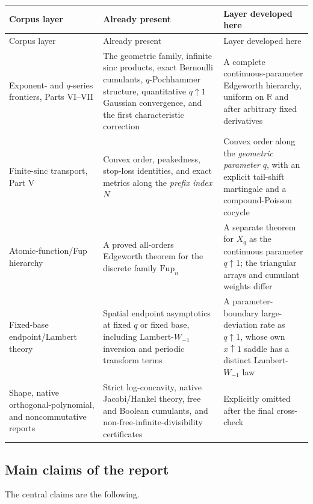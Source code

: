 \documentclass[11pt,a4paper]{article}
\theoremstyle{definition}
\newcommand{\R}{\mathbb{R}}
\newcommand{\1}{\mathbf{1}}
\begin{document}
\begin{longtable}{p{}p{}p{}}
\toprule
Corpus layer & Already present & Layer developed here \\
\midrule
\endfirsthead
\toprule
Corpus layer & Already present & Layer developed here \\
\midrule
\endhead
Exponent- and $q$-series frontiers, Parts VI--VII
& The geometric family, infinite sinc products, exact Bernoulli cumulants,
$q$-Pochhammer structure, quantitative $q\uparrow1$ Gaussian convergence, and
the first characteristic correction
& A complete continuous-parameter Edgeworth hierarchy, uniform on $\R$ and
after arbitrary fixed derivatives \\
\addlinespace
Finite-sinc transport, Part V
& Convex order, peakedness, stop-loss identities, and exact metrics along the
\emph{prefix index} $N$
& Convex order along the \emph{geometric parameter} $q$, with an explicit
tail-shift martingale and a compound-Poisson cocycle \\
\addlinespace
Atomic-function/Fup hierarchy
& A proved all-orders Edgeworth theorem for the discrete family
$\mathrm{Fup}_n$
& A separate theorem for $X_q$ as the continuous parameter $q\uparrow1$;
the triangular arrays and cumulant weights differ \\
\addlinespace
Fixed-base endpoint/Lambert theory
& Spatial endpoint asymptotics at fixed $q$ or fixed base, including
Lambert-$W_{-1}$ inversion and periodic transform terms
& A parameter-boundary large-deviation rate as $q\uparrow1$, whose own
$x\uparrow1$ saddle has a distinct Lambert-$W_{-1}$ law \\
\addlinespace
Shape, native orthogonal-polynomial, and noncommutative reports
& Strict log-concavity, native Jacobi/Hankel theory, free and Boolean
cumulants, and non-free-infinite-divisibility certificates
& Explicitly omitted after the final cross-check \\
\bottomrule
\end{longtable}

\subsection{Main claims of the report}

The central claims are the following.
\end{document}
